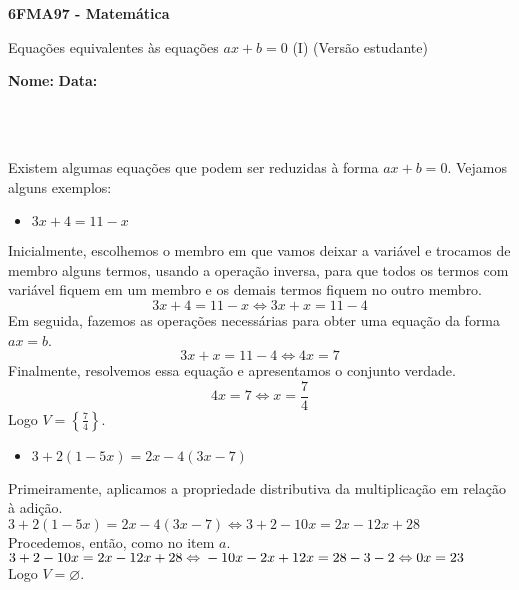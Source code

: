\documentclass[a4paper,14pt]{article}
\begin{document}
	
	\noindent\textbf{6FMA97 - Matemática} 
	
	\begin{center}Equações equivalentes às equações $ax + b = 0$ (I) (Versão estudante)
	\end{center}
	
	\noindent\textbf{Nome:} \underline{\hspace{10cm}}
	\noindent\textbf{Data:} \underline{\hspace{4cm}}
	
	~ \\ ~
	\begin{multicols}{2}
		\noindent Existem algumas equações que podem ser reduzidas à forma $ax + b = 0$. Vejamos alguns exemplos:
		\begin{itemize}
			\item $3x + 4 = 11 - x$ \\
		\end{itemize}
		Inicialmente, escolhemos o membro em que vamos deixar a variável e trocamos de membro alguns termos, usando a operação inversa, para que todos os termos com variável fiquem em um membro e os demais termos fiquem no outro membro. \vspace{-10pt}
		\begin{equation*}
			3x + 4 = 11 - x \Leftrightarrow 3x + x = 11 - 4
		\end{equation*}
		Em seguida, fazemos as operações necessárias para obter uma equação da forma $ax = b$.
		\begin{equation*}
			3x + x = 11 - 4 \Leftrightarrow 4x = 7
		\end{equation*}
		Finalmente, resolvemos essa equação e apresentamos o conjunto verdade.
		\begin{equation*}
			4x = 7 \Leftrightarrow x = \frac{7}{4}
		\end{equation*}
		Logo $V = \left\{\frac{7}{4}\right\}$.
		\begin{itemize}
			\item $3 + 2(1 - 5x) = 2x - 4(3x - 7)$
		\end{itemize}
		Primeiramente, aplicamos a propriedade distributiva da multiplicação em relação à adição. \\
		$3 + 2(1 - 5x) = 2x - 4(3x - 7) \Leftrightarrow 3 + 2 - 10x = 2x - 12x + 28$ \\
		Procedemos, então, como no item $a$. \\
		$3 + 2 - 10x = 2x - 12x + 28 \Leftrightarrow \\ -10x - 2x + 12x = 28 - 3 - 2 \Leftrightarrow \\ 0x = 23$ \\
		Logo $V = \varnothing$.
	\end{multicols}
\end{document}
